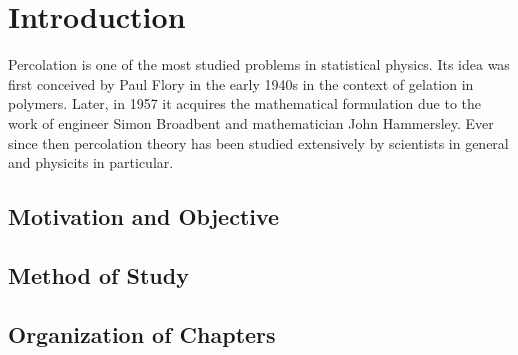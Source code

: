 
\ifpdf
\graphicspath{{Chapter1/Figs/Raster/}{Chapter1/Figs/PDF/}{Chapter1/Figs/}}
\else
\graphicspath{{Chapter1/Figs/Vector/}{Chapter1/Figs/}}
\fi

\chapter{Introduction}  %
Percolation is one of the most studied problems in statistical physics. Its idea was first conceived by Paul Flory in the early 1940s in the context of gelation in polymers. Later, in 1957 it acquires the mathematical formulation due to the work of engineer Simon Broadbent and mathematician John Hammersley. Ever since then percolation theory has been studied extensively by scientists in general and physicits in particular.

\section{Motivation and Objective} %

\section{Method of Study}  %

\section{Organization of Chapters}
